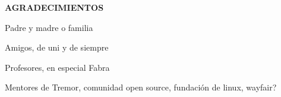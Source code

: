 
\begin{center}
{\LARGE \bfseries AGRADECIMIENTOS}
\vspace{2.5cm}
\end{center}

Padre y madre o familia

Amigos, de uni y de siempre

Profesores, en especial Fabra

Mentores de Tremor, comunidad open source, fundación de linux, wayfair?
